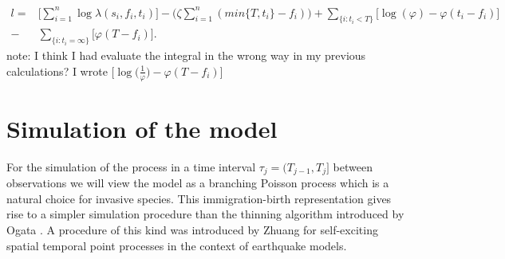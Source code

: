 \documentclass[11pt,a4paper]{article}
\begin{document}
{\color{red}
\begin{equation*}
    \begin{aligned}
        l = & \Bigg[ \sum_{i = 1}^{n} \log \lambda(s_{i},f_{i}, t_{i}) \Bigg] - \bigg(\zeta \sum_{i=1}^{n} (min\{ T, t_i \} - f_i) \bigg)  + \sum_{\{ i : t_{i} < T \} }  \bigg[\log (\varphi) -\varphi(t_{i} - f_{i}) \bigg] \\
        - & \sum_{ \{ i : t_{i} = \infty \} } \bigg[\varphi(T - f_{i}) \bigg].
    \end{aligned}
\end{equation*}
note: I think I had evaluate the integral in the wrong way in my previous calculations? I wrote $\bigg[\log \bigg(\frac{1}{\varphi}\bigg) -\varphi(T - f_{i}) \bigg]$}

{\color{red}\section{Simulation of the model} \label{section:simulationModel}

For the simulation of the process in a time interval $\tau_j = (T_{j-1}, T_j]$ between observations we will view the model as a branching Poisson process \cite{Lewis} which is a natural choice for invasive species. This immigration-birth representation gives rise to a simpler simulation procedure than the thinning algorithm introduced by Ogata \cite{Ogata}. A procedure of this kind was introduced by Zhuang \cite{Zhuang} for self-exciting spatial temporal point processes in the context of earthquake models.

}
\end{document}
